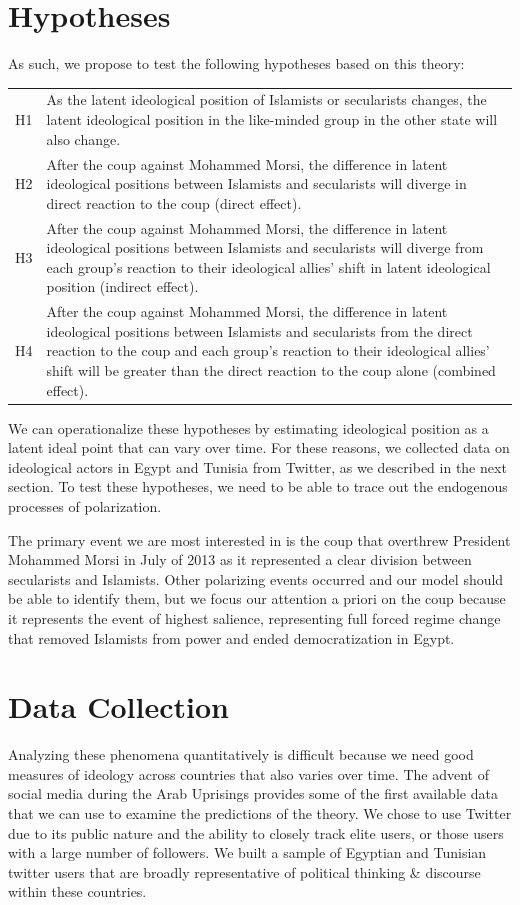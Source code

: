 \documentclass[12pt]{article}
\begin{document}
\section*{Hypotheses}

As such, we propose to test the following hypotheses based on this theory:

\begin{tabular}{lp{15cm}}
	H1 & As the latent ideological position of Islamists or secularists changes, the latent ideological position in the like-minded group in the other state will also change.\\
	H2 & After the coup against Mohammed Morsi, the difference in latent ideological positions between Islamists and secularists will diverge in direct reaction to the coup (direct effect).\\
	H3 & After the coup against Mohammed Morsi, the difference in latent ideological positions between Islamists and secularists will diverge from each group's reaction to their ideological allies' shift in latent ideological position (indirect effect).\\
	H4 & After the coup against Mohammed Morsi, the difference in latent ideological positions between Islamists and secularists from the direct reaction to the coup and each group's reaction to their ideological allies' shift will be greater than the direct reaction to the coup alone (combined effect).
\end{tabular}

We can operationalize these hypotheses by estimating ideological position as a latent ideal point that can vary over time. For these reasons, we collected data on ideological actors in Egypt and Tunisia from Twitter, as we described in the next section. To test these hypotheses, we need to be able to trace out the endogenous processes of polarization.

The primary event we are most interested in is the coup that overthrew President Mohammed Morsi in July of 2013 as it represented a clear division between secularists and Islamists. Other polarizing events occurred and our model should be able to identify them, but we focus our attention a priori on the coup because it represents the event of highest salience, representing full forced regime change that removed Islamists from power and ended democratization in Egypt.
 
\section*{Data Collection}
Analyzing these phenomena quantitatively is difficult because we need good measures of ideology across countries that also varies over time. The advent of social media during the Arab Uprisings provides some of the first available data that we can use to examine the predictions of the theory. We chose to use Twitter due to its public nature and the ability to closely track elite users, or those users with a large number of followers. We built a sample of Egyptian and Tunisian twitter users that are broadly representative of political thinking \& discourse within these countries.
\end{document}
